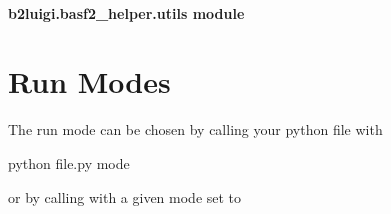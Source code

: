 \documentclass[letterpaper,10pt,english]{sphinxmanual}
\begin{document}
\paragraph{b2luigi.basf2\_helper.utils module}
\label{\detokenize{documentation/b2luigi.basf2_helper:module-b2luigi.basf2_helper.utils}}\label{\detokenize{documentation/b2luigi.basf2_helper:b2luigi-basf2-helper-utils-module}}

\begin{fulllineitems}
\label{\detokenize{documentation/b2luigi.basf2_helper:b2luigi.basf2_helper.utils.get_basf2_git_hash}}
\end{fulllineitems}



\section{Run Modes}
\label{\detokenize{documentation/run_modes:run-modes}}\label{\detokenize{documentation/run_modes:run-modes-label}}\label{\detokenize{documentation/run_modes::doc}}
The run mode can be chosen by calling your python file with

\begin{sphinxVerbatim}[commandchars=\\\{\}]
python file.py \PYGZhy{}\PYGZhy{}mode
\end{sphinxVerbatim}

or by calling  with a given mode set to 

\begin{sphinxVerbatim}[commandchars=\\\{\}]
 
\end{sphinxVerbatim}
\end{document}
